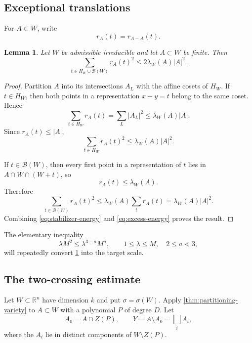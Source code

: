 \documentclass[11pt]{amsart}
\numberwithin{equation}{section}
\newtheorem{lemma}[theorem]{Lemma}
\theoremstyle{definition}
\theoremstyle{remark}
\newcommand{\R}{\mathbb R}
\newcommand{\cB}{\mathcal B}
\newcommand{\1}{\mathbf 1}
\newcommand{\card}[1]{\lvert #1\rvert}
\begin{document}
\subsection{Exceptional translations}
For $A\subset W$, write
\[
 r_A(t)=r_{A-A}(t).
\]

\begin{lemma}\label{lem:exceptional-energy}
Let $W$ be admissible irreducible and let $A\subset W$ be finite.  Then
\begin{equation}\label{eq:exceptional-energy}
 \sum_{t\in H_W\cup\cB(W)}r_A(t)^2
 \leq 2\lambda_W(A)\card A^2.
\end{equation}
\end{lemma}

\begin{proof}
Partition $A$ into its intersections $A_L$ with the affine cosets of $H_W$.  If $t\in H_W$, then both points in a representation $x-y=t$ belong to the same coset.  Hence
\[
 \sum_{t\in H_W}r_A(t)
 =\sum_L\card{A_L}^2
 \leq\lambda_W(A)\card A.
\]
Since $r_A(t)\leq\card A$,
\begin{equation}\label{eq:stabilizer-energy}
 \sum_{t\in H_W}r_A(t)^2
 \leq\lambda_W(A)\card A^2.
\end{equation}

If $t\in\cB(W)$, then every first point in a representation of $t$ lies in $A\cap W\cap(W+t)$, so
\[
 r_A(t)\leq\lambda_W(A).
\]
Therefore
\begin{equation}\label{eq:excess-energy}
 \sum_{t\in\cB(W)}r_A(t)^2
 \leq\lambda_W(A)\sum_t r_A(t)
 =\lambda_W(A)\card A^2.
\end{equation}
Combining \eqref{eq:stabilizer-energy} and \eqref{eq:excess-energy} proves the result.
\end{proof}

The elementary inequality
\begin{equation}\label{eq:lambda-interpolation}
 \lambda M^2\leq\lambda^{3-a}M^a,
 \qquad 1\leq\lambda\leq M,
 \quad 2\leq a<3,
\end{equation}
will repeatedly convert \cref{lem:exceptional-energy} into the target scale.

\subsection{The two-crossing estimate}
Let $W\subset\R^n$ have dimension $k$ and put $\sigma=\sigma(W)$.  Apply \cref{thm:partitioning-variety} to $A\subset W$ with a polynomial $P$ of degree $D$.  Let
\[
 A_0=A\cap Z(P),
 \qquad
 Y=A\setminus A_0=\bigsqcup_i A_i,
\]
where the $A_i$ lie in distinct components of $W\setminus Z(P)$.
\end{document}

